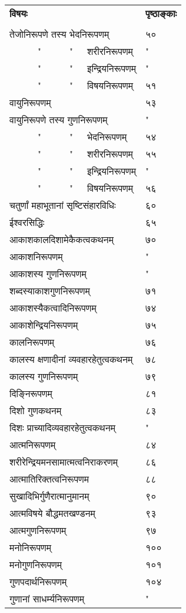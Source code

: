 \documentclass[11pt, openany]{book}
\begin{document}
\noindent
\begin{tabular}{m{28em} m{2em}}
\textbf{विषयः} & \textbf{पृष्ठाङ्काः}\\
 & \\
 तेजोनिरूपणे तस्य भेदनिरूपणम् & ५०\\
~~~~~~"~~~~~~"~~~शरीरनिरूपणम् & "\\
~~~~~~"~~~~~~"~~~इन्द्रियनिरूपणम् & "\\
~~~~~~"~~~~~~"~~~विषयनिरूपणम् & ५१\\
वायुनिरूपणम् & ५३\\
वायुनिरूपणे तस्य गुणनिरूपणम् & "\\
~~~~~~"~~~~~~"~~~भेदनिरूपणम् & ५४\\
~~~~~~"~~~~~~"~~~शरीरनिरूपणम् & ५५\\
~~~~~~"~~~~~~"~~~इन्द्रियनिरूपणम् & "\\
~~~~~~"~~~~~~"~~~विषयनिरूपणम् & ५६\\
चतुर्णां महाभूतानां सृष्टिसंहारविधिः & ६०\\
ईश्वरसिद्धिः & ६५\\
आकाशकालदिशामेकैकत्वकथनम् & ७०\\
आकाशनिरूपणम् & "\\
आकाशस्य गुणनिरूपणम् & "\\
शब्दस्याकाशगुणनिरूपणम् & ७१\\
आकाशस्यैकत्वादिनिरूपणम् & ७४\\
आकाशेन्द्रियनिरूपणम् & ७५\\
कालनिरूपणम् & ७६\\
कालस्य क्षणादीनां व्यवहारहेतुत्वकथनम् & ७८\\
कालस्य गुणनिरूपणम् & ७९\\
दिङ्निरूपणम् & ८१\\
दिशो गुणकथनम् & ८३\\
दिशः प्राच्यादिव्यवहारहेतुत्वकथनम् & "\\
आत्मनिरूपणम् & ८४\\
शरीरेन्द्रियमनसामात्मत्वनिराकरणम् & ८६\\
आत्मातिरिक्तत्वनिरूपणम & ८८\\
सुखादिभिर्गुणैरात्मानुमानम् & ९०\\
आत्मविषये बौद्धमतखण्डनम् & ९३\\
आत्मगुणनिरूपणम् & ९७\\
मनोनिरूपणम् & १००\\
मनोगुणनिरूपणम् & १०१\\
गुणपदार्थनिरूपणम् & १०४\\
गुणानां साधर्म्यनिरूपणम् & "\\
\end{tabular}
\end{document}
